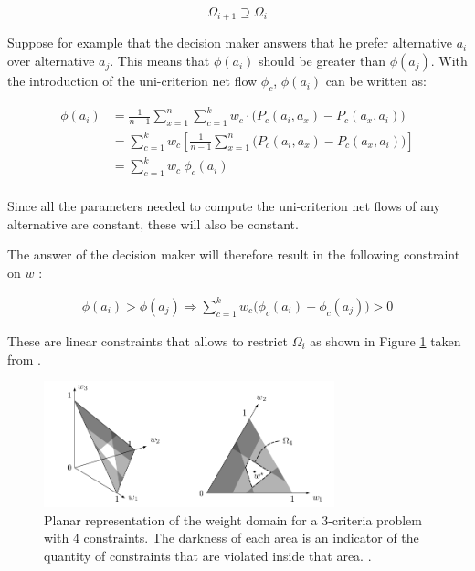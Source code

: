 \begin{equation}
    \Omega_{i+1} \supseteq \Omega_i
\end{equation}

Suppose for example that the decision maker answers that he prefer alternative $a_i$ over alternative $a_j$. This means that $\phi(a_i)$ should be greater than $\phi(a_j)$. 
\newpage
With the introduction of the uni-criterion net flow $\phi_c$, $\phi(a_i)$ can be written as:

\begin{equation}
    \begin{split}
    \phi(a_i) & = \frac{1}{n-1}\sum\limits^n_{x=1}\sum\limits^k_{c=1} w_c \cdot \big(P_c(a_i,a_x) - P_c(a_x, a_i)\big) \\
              & = \sum\limits^k_{c=1} w_c \left[\frac{1}{n-1} \sum\limits^n_{x=1} \big(P_c(a_i,a_x) - P_c(a_x, a_i)\big)\right] \\
              & = \sum\limits^k_{c=1} w_c \ \phi_c(a_i) \\
    \end{split}
\end{equation}

Since all the parameters needed to compute the uni-criterion net flows of any alternative are constant, these will also be constant.

The answer of the decision maker will therefore result in the following constraint on $w$ \cite{eppe2014adaptive}:

\begin{equation}
    \begin{split}
        \phi(a_i) > \phi(a_j) \Rightarrow \sum\limits^k_{c=1} w_c \big( \phi_c(a_i) - \phi_c(a_j)\big) > 0
    \end{split}
\end{equation}

These are linear constraints that allows to restrict $\Omega_i$ as shown in Figure \ref{fig:planar_representation_weight_domain} taken from \cite{eppe2014adaptive}.

\begin{figure}[h]
\centering
    \includegraphics[width=0.75\textwidth]{referenced_promethee/src/representation_from_Eppe.png}
    \caption{Planar representation of the weight domain for a 3-criteria problem with 4 constraints. The darkness of each area is an indicator of the quantity of constraints that are violated inside that area. \cite{eppe2014adaptive}.}
    \label{fig:planar_representation_weight_domain}
\end{figure}


